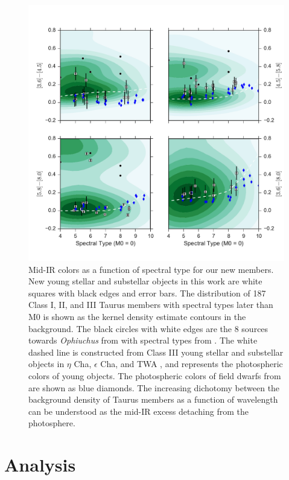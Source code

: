 \documentclass[12pt,preprint]{aastex}
\begin{document}
\begin{figure}[ht!]
  \caption{ Mid-IR colors as a function of spectral type for our new members.  New young stellar and substellar objects in this work are white squares with black edges and error bars.  The distribution of 187 Class I, II, and III Taurus members with spectral types later than M0 \citep{2010ApJS..186..111L} is shown as the kernel density estimate contours in the background.  The black circles with white edges are the 8 sources towards \emph{Ophiuchus} from \citet{allers06} with spectral types from \citet{2011ASPC..448..633G}.  The white dashed line is constructed from Class III young stellar and substellar objects in $\eta$ Cha, $\epsilon$ Cha, and TWA \citep{2010ApJS..186..111L}, and represents the photospheric colors of young objects.  The photospheric colors of field dwarfs from \citet{2006ApJ...651..502P} are shown as blue diamonds. 
  The increasing dichotomy between the background density of Taurus members as a function of wavelength can be understood as the mid-IR excess detaching from the photosphere.    \label{fig_midIR_results} }
\centering
\includegraphics[scale=0.6]{figures/midIR_phot_results.pdf}
\end{figure}

\section{Analysis}
\end{document}
